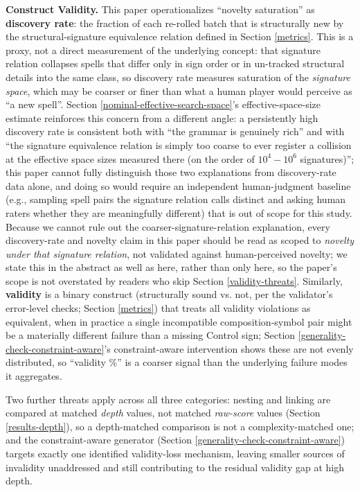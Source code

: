 \documentclass[]{article}
\begin{document}
        \textbf{Construct Validity.} This paper operationalizes ``novelty saturation'' as \textbf{discovery rate}: the fraction of each re-rolled batch that is structurally new by the structural-signature equivalence relation defined in Section \ref{metrics}. This is a proxy, not a direct measurement of the underlying concept: that signature relation collapses spells that differ only in sign order or in un-tracked structural details into the same class, so discovery rate measures saturation of the \textit{signature space}, which may be coarser or finer than what a human player would perceive as ``a new spell''. Section \ref{nominal-effective-search-space}'s effective-space-size estimate reinforces this concern from a different angle: a persistently high discovery rate is consistent both with ``the grammar is genuinely rich'' and with ``the signature equivalence relation is simply too coarse to ever register a collision at the effective space sizes measured there (on the order of $10^4-10^6$ signatures)''; this paper cannot fully distinguish those two explanations from discovery-rate data alone, and doing so would require an independent human-judgment baseline (e.g., sampling spell pairs the signature relation calls distinct and asking human raters whether they are meaningfully different) that is out of scope for this study. Because we cannot rule out the coarser-signature-relation explanation, every discovery-rate and novelty claim in this paper should be read as scoped to \textit{novelty under that signature relation}, not validated against human-perceived novelty; we state this in the abstract as well as here, rather than only here, so the paper's scope is not overstated by readers who skip Section \ref{validity-threats}. Similarly, \textbf{validity} is a binary construct (structurally sound vs. not, per the validator's error-level checks; Section \ref{metrics}) that treats all validity violations as equivalent, when in practice a single incompatible composition-symbol pair might be a materially different failure than a missing Control sign; Section \ref{generality-check-constraint-aware}'s constraint-aware intervention shows these are not evenly distributed, so ``validity \%'' is a coarser signal than the underlying failure modes it aggregates.
        
        Two further threats apply across all three categories: nesting and linking are compared at matched \textit{depth} values, not matched \textit{raw-score} values (Section \ref{results-depth}), so a depth-matched comparison is not a complexity-matched one; and the constraint-aware generator (Section \ref{generality-check-constraint-aware}) targets exactly one identified validity-loss mechanism, leaving smaller sources of invalidity unaddressed and still contributing to the residual validity gap at high depth.
\end{document}
